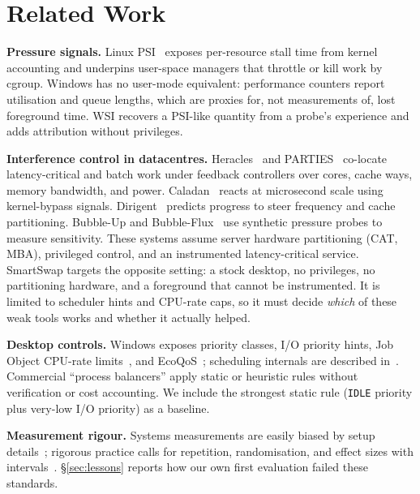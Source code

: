 \section{Related Work}
\label{sec:related}

\textbf{Pressure signals.} Linux PSI~\cite{weiner2018psi} exposes per-resource stall time from kernel accounting and underpins user-space managers that throttle or kill work by cgroup. Windows has no user-mode equivalent: performance counters report utilisation and queue lengths, which are proxies for, not measurements of, lost foreground time. WSI recovers a PSI-like quantity from a probe's experience and adds attribution without privileges.

\textbf{Interference control in datacentres.} Heracles~\cite{lo2015heracles} and PARTIES~\cite{chen2019parties} co-locate latency-critical and batch work under feedback controllers over cores, cache ways, memory bandwidth, and power. Caladan~\cite{fried2020caladan} reacts at microsecond scale using kernel-bypass signals. Dirigent~\cite{zhu2016dirigent} predicts progress to steer frequency and cache partitioning. Bubble-Up and Bubble-Flux~\cite{mars2011bubbleup,yang2013bubbleflux} use synthetic pressure probes to measure sensitivity. These systems assume server hardware partitioning (CAT, MBA), privileged control, and an instrumented latency-critical service. SmartSwap targets the opposite setting: a stock desktop, no privileges, no partitioning hardware, and a foreground that cannot be instrumented. It is limited to scheduler hints and CPU-rate caps, so it must decide \emph{which} of these weak tools works and whether it actually helped.

\textbf{Desktop controls.} Windows exposes priority classes, I/O priority hints, Job Object CPU-rate limits~\cite{msjobobjects}, and EcoQoS~\cite{msqos}; scheduling internals are described in~\cite{russinovich2017internals}. Commercial ``process balancers'' apply static or heuristic rules without verification or cost accounting. We include the strongest static rule (\texttt{IDLE} priority plus very-low I/O priority) as a baseline.

\textbf{Measurement rigour.} Systems measurements are easily biased by setup details~\cite{mytkowicz2009wrongdata}; rigorous practice calls for repetition, randomisation, and effect sizes with intervals~\cite{georges2007rigorous,kalibera2013rigorous}. \S\ref{sec:lessons} reports how our own first evaluation failed these standards.


